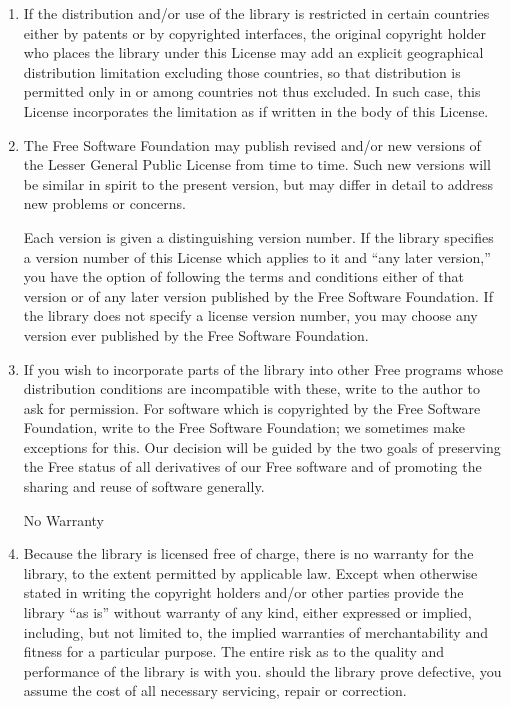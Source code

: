 \documentclass[11pt, letterpaper]{book}
\begin{document}
\begin{enumerate}


\item 

  If the distribution and/or use of the library is restricted in certain
  countries either by patents or by copyrighted interfaces, the original
  copyright holder who places the library under this License may add an
  explicit geographical distribution limitation excluding those countries,
  so that distribution is permitted only in or among countries not thus
  excluded. In such case, this License incorporates the limitation as if
  written in the body of this License.

\item 

  The Free Software Foundation may publish revised and/or new versions of
  the Lesser General Public License from time to time. Such new versions
  will be similar in spirit to the present version, but may differ in
  detail to address new problems or concerns.

  Each version is given a distinguishing version number. If the library
  specifies a version number of this License which applies to it and ``any
  later version,'' you have the option of following the terms and
  conditions either of that version or of any later version published by
  the Free Software Foundation. If the library does not specify a license
  version number, you may choose any version ever published by the Free
  Software Foundation.


\item
  

  If you wish to incorporate parts of the library into other Free programs
  whose distribution conditions are incompatible with these, write to the
  author to ask for permission. For software which is copyrighted by the
  Free Software Foundation, write to the Free Software Foundation; we
  sometimes make exceptions for this. Our decision will be guided by the
  two goals of preserving the Free status of all derivatives of our Free
  software and of promoting the sharing and reuse of software generally.


\begin{center}
{\Large\sc
No Warranty
}
\end{center}

\item

{\sc Because the library is licensed free of charge, there is no
warranty for the library, to the extent permitted by applicable law.
Except when otherwise stated in writing the copyright holders and/or
other parties provide the library ``as is'' without warranty of any
kind, either expressed or implied, including, but not limited to, the
implied warranties of merchantability and fitness for a particular
purpose. The entire risk as to the quality and performance of the
library is with you. should the library prove defective, you assume
the cost of all necessary servicing, repair or correction.}


\end{enumerate}
\end{document}
